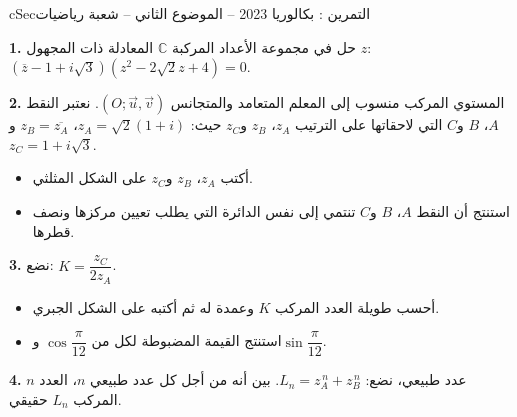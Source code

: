 \documentclass[12pt,a4paper]{article}
\newenvironment{BOX}[2]{\begin{otherlanguage}{english}\begin{arbox}{#1}{#2}}{\end{arbox}\end{otherlanguage}}
\newcounter{exo}
\newenvironment{tamrin}[1]{\stepcounter{exo}\begin{BOX}{cSec}{التمرين \theexo: #1}}{\end{BOX}}
\newenvironment{sq}{\begin{itemize}[leftmargin=2.4em,itemsep=3pt]}{\end{itemize}}
\newcommand{\qa}{\item[(أ)]}\newcommand{\qb}{\item[(ب)]}\newcommand{\qc}{\item[(جـ)]}\newcommand{\qd}{\item[(د)]}\newcommand{\qe}{\item[(هـ)]}
\newcommand{\QQ}[1]{\par\smallskip\textbf{#1.} }
\begin{document}
\begin{tamrin}{بكالوريا 2023 -- الموضوع الثاني -- شعبة رياضيات}
\QQ{1} حل في مجموعة الأعداد المركبة $\mathbb{C}$ المعادلة ذات المجهول $z$: $\left(\overline{z}-1+i\sqrt3\right)\left(z^2-2\sqrt2z+4\right)=0$.

\QQ{2} المستوي المركب منسوب إلى المعلم المتعامد والمتجانس $\left(O;\vec u,\vec v\right)$.
نعتبر النقط $A$، $B$ و$C$ التي لاحقاتها على الترتيب $z_A$، $z_B$ و$z_C$ حيث: $z_A=\sqrt2(1+i)$، $z_B=\overline{z_A}$ و$z_C=1+i\sqrt3$.
\begin{sq}
\qa أكتب $z_A$، $z_B$ و$z_C$ على الشكل المثلثي.
\qb استنتج أن النقط $A$، $B$ و$C$ تنتمي إلى نفس الدائرة التي يطلب تعيين مركزها ونصف قطرها.
\end{sq}
\QQ{3} نضع: $K=\dfrac{z_C}{2z_A}$.
\begin{sq}
\qa أحسب طويلة العدد المركب $K$ وعمدة له ثم أكتبه على الشكل الجبري.
\qb استنتج القيمة المضبوطة لكل من $\cos\dfrac{\pi}{12}$ و$\sin\dfrac{\pi}{12}$.
\end{sq}
\QQ{4} $n$ عدد طبيعي، نضع: $L_n=z_A^{\,n}+z_B^{\,n}$. بين أنه من أجل كل عدد طبيعي $n$، العدد المركب $L_n$ حقيقي.
\end{tamrin}
\end{document}
